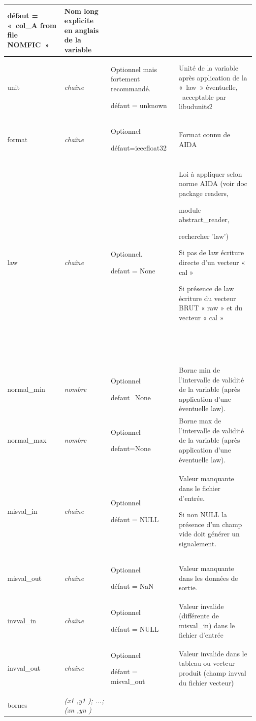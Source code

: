 {\begin{center}
\begin{supertabular}{|p{2.9099998cm}|p{3.783cm}|p{4.058cm}|p{4.4500003cm}|}
défaut = «~col\_A from file NOMFIC~» &
Nom long explicite en anglais de la variable\\\hline
unit &
{\itshape chaîne} &
Optionnel mais fortement recommandé.

défaut = unknown &
Unité de la variable après application de la «~law~» éventuelle, \ acceptable par libudunits2\\\hline
format  &
{\itshape chaîne} &
Optionnel

défaut=ieeefloat32 &
Format connu de AIDA\\\hline
law &
{\itshape chaîne} &
Optionnel.

defaut = None &
Loi à appliquer selon norme AIDA 
(voir doc package readers,
 
module abstract\_reader,
 
rechercher 'law')

Si pas de law écriture directe d'un vecteur « cal »

Si présence de law écriture du vecteur BRUT « raw » et du vecteur « cal »

~

~
\\\hline
normal\_min &
{\itshape nombre} &
Optionnel

defaut=None &
Borne min de l'intervalle de validité de la variable (après application d'une éventuelle law).\\\hline
normal\_max &
{\itshape nombre} &
Optionnel

defaut=None &
Borne max de l'intervalle de validité de la variable (après application d'une éventuelle law).\\\hline
misval\_in &
{\itshape chaîne} &
Optionnel

défaut = NULL &
Valeur manquante dans le fichier d'entrée.

Si non NULL la présence d'un champ vide doit générer un signalement.\\\hline
misval\_out &
{\itshape chaîne} &
Optionnel

défaut = NaN &
Valeur manquante dans les données de sortie.\\\hline
invval\_in &
{\itshape chaîne} &
Optionnel

défaut = NULL &
Valeur invalide (différente de misval\_in) dans le fichier d'entrée\\\hline
invval\_out &
{\itshape chaîne} &
Optionnel

défaut = misval\_out &
Valeur invalide dans le tableau ou vecteur produit (champ invval du fichier vecteur)\\\hline
bornes  &
{\itshape (x{1} ,y{1} ); ...; (x{n },y{n} )}


\end{supertabular}
\end{center}}
